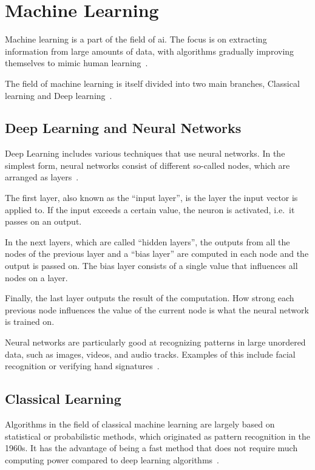 \section{Machine Learning}\label{sec:machine_learning}
Machine learning is a part of the field of \ac{ai}. The focus is on extracting information from large amounts of data, with algorithms gradually improving themselves to mimic human learning~\cite{what-is-ml}.

The field of machine learning is itself divided into two main branches, Classical learning and Deep learning~\cite{ml-visual-explanation}.


\subsection{Deep Learning and Neural Networks} %

Deep Learning includes various techniques that use neural networks. In the simplest form, neural networks consist of different so-called nodes, which are arranged as layers~\cite{neuralNet}.

The first layer, also known as the \enquote{input layer}, is the layer the input vector is applied to. If the input exceeds a certain value, the neuron is activated, i.e.\ it passes on an output.

In the next layers, which are called \enquote{hidden layers}, the outputs from all the nodes of the previous layer and a \enquote{bias layer} are computed in each node and the output is passed on. The bias layer consists of a single value that influences all nodes on a layer.

Finally, the last layer outputs the result of the computation. How strong each previous node influences the value of the current node is what the neural network is trained on.

Neural networks are particularly good at recognizing patterns in large unordered data, such as images, videos, and audio tracks. Examples of this include facial recognition or verifying hand signatures~\cite{neuralNet-applications}.



\subsection{Classical Learning} %
Algorithms in the field of classical machine learning are largely based on statistical or probabilistic methods, which originated as pattern recognition in the 1960s. It has the advantage of being a fast method that does not require much computing power compared to deep learning algorithms~\cite{classical-ml}.

